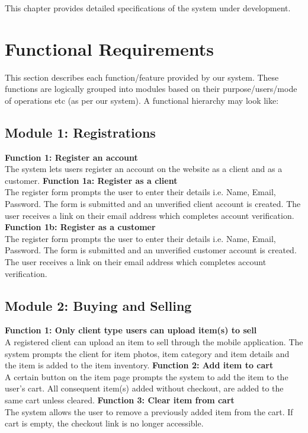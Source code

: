 This chapter provides detailed specifications of the system under development.

\section{Functional Requirements}

This section describes each function/feature provided by our system. These functions are logically grouped into modules based on their purpose/users/mode of operations etc (as per our system). A functional hierarchy may look like:
\subsection*{Module 1: Registrations}
\begin{outline}
    \1 \textbf{Function 1: Register an account} \\
    The system lets users register an account on the website as a client and as a customer.
        \2 \textbf{Function 1a: Register as a client} \\
        The register form prompts the user to enter their details i.e. Name, Email, Password. The form is submitted and an unverified client account is created. The user receives a link on their email address which completes account verification.
        \2 \textbf{Function 1b: Register as a customer} \\
        The register form prompts the user to enter their details i.e. Name, Email, Password. The form is submitted and an unverified customer account is created. The user receives a link on their email address which completes account verification.
\end{outline}
\subsection*{Module 2: Buying and Selling}
\begin{outline}
    \1 \textbf{Function 1: Only client type users can upload item(s) to sell} \\
    A registered client can upload an item to sell through the mobile application. The system prompts the client for item photos, item category and item details and the item is added to the item inventory.
    \1 \textbf{Function 2: Add item to cart}\\
    A certain button on the item page prompts the system to add the item to the user's cart. All consequent item(s) added without checkout, are added to the same cart unless cleared.
    \1 \textbf{Function 3: Clear item from cart}\\
    The system allows the user to remove a previously added item from the cart. If cart is empty, the checkout link is no longer accessible.
\end{outline}
